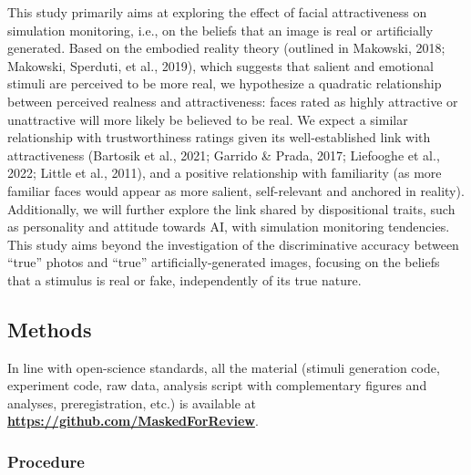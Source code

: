 \documentclass[
  man,mask,floatsintext]{apa6}
\begin{document}
This study primarily aims at exploring the effect of facial attractiveness on simulation monitoring, i.e., on the beliefs that an image is real or artificially generated. Based on the embodied reality theory (outlined in Makowski, 2018; Makowski, Sperduti, et al., 2019), which suggests that salient and emotional stimuli are perceived to be more real, we hypothesize a quadratic relationship between perceived realness and attractiveness: faces rated as highly attractive or unattractive will more likely be believed to be real. We expect a similar relationship with trustworthiness ratings given its well-established link with attractiveness (Bartosik et al., 2021; Garrido \& Prada, 2017; Liefooghe et al., 2022; Little et al., 2011), and a positive relationship with familiarity (as more familiar faces would appear as more salient, self-relevant and anchored in reality). Additionally, we will further explore the link shared by dispositional traits, such as personality and attitude towards AI, with simulation monitoring tendencies. This study aims beyond the investigation of the discriminative accuracy between ``true'' photos and ``true'' artificially-generated images, focusing on the beliefs that a stimulus is real or fake, independently of its true nature.

\hypertarget{methods}{%
\subsection{Methods}\label{methods}}

In line with open-science standards, all the material (stimuli generation code, experiment code, raw data, analysis script with complementary figures and analyses, preregistration, etc.) is available at \href{https://github.com/RealityBending/FakeFace}{\textbf{https://github.com/MaskedForReview}}.

\hypertarget{procedure}{%
\subsubsection{Procedure}\label{procedure}}
\end{document}
